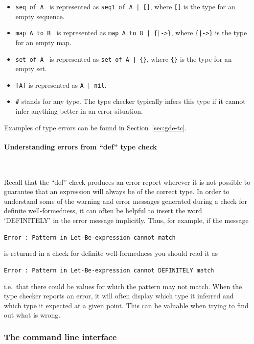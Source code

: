 \documentclass[\pformat,12pt]{article}
\newcommand{\subsubsubsection}[1]{\paragraph{#1}\mbox{}\\}
\begin{document}
\begin{itemize}
\item {\tt seq of A } is represented as {\tt seq1 of A | []}, where
  {\tt []} is the type for an empty sequence.
  
\item {\tt map A to B } is represented as {\tt map A to B | \{|->\}},
  where {\tt \{|->\}} is the type for an empty map.
  
\item {\tt set of A } is represented as {\tt set of A | \{\}}, where
  {\tt \{\}} is the type for an empty set.
  
\item {\tt [A]} is represented as {\tt A | nil}.
  
\item {\tt \#} stands for any type. The type checker typically infers
  this type if it cannot infer anything better in an error situation.

\end{itemize}

Examples of type errors can be found in Section~\ref{sec:gde-tc}.

\subsubsubsection{Understanding errors from ``def'' type check} 

Recall that the ``def'' check produces an error report wherever it is not
possible to guarantee that an expression will always be of the correct type. 
In order to understand some of the warning and error messages
generated during a check for definite well-formedness, it can often be
helpful to  insert the word `DEFINITELY' in the error message
implicitly. Thus, for example, if the message

{\tt Error : Pattern in Let-Be-expression cannot match}

is returned in a check for definite well-formedness you should read it as

{\tt Error : Pattern in Let-Be-expression cannot DEFINITELY match}

i.e.\ that there could be values for which the pattern may not match.
When the type checker reports an error, it will often display which
type it inferred and which type it expected at a given point. This can
be valuable when trying to find out what is wrong.


\subsubsection{The command line interface}
\end{document}
